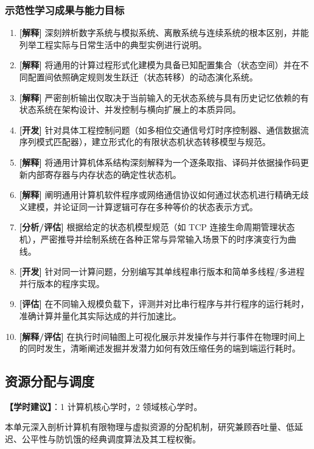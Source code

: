 \subsubsection{示范性学习成果与能力目标}
\begin{enumerate}
    \item \textbf{[解释]} 深刻辨析数字系统与模拟系统、离散系统与连续系统的根本区别，并能列举工程实际与日常生活中的典型实例进行说明。
    \item \textbf{[解释]} 将通用的计算过程形式化建模为具备已知配置集合（状态空间）并在不同配置间依照确定规则发生跃迁（状态转移）的动态演化系统。
    \item \textbf{[解释]} 严密剖析输出仅取决于当前输入的无状态系统与具有历史记忆依赖的有状态系统在架构设计、并发控制与横向扩展上的本质异同。
    \item \textbf{[开发]} 针对具体工程控制问题（如多相位交通信号灯时序控制器、通信数据流序列模式匹配器），建立形式化的有限状态机状态转移模型与规范。
    \item \textbf{[解释]} 将通用计算机体系结构深刻解释为一个逐条取指、译码并依据操作码更新内部寄存器与内存状态的确定性状态机。
    \item \textbf{[解释]} 阐明通用计算机软件程序或网络通信协议如何通过状态机进行精确无歧义建模，并论证同一计算逻辑可存在多种等价的状态表示方式。
    \item \textbf{[分析/评估]} 根据给定的状态机模型规范（如 TCP 连接生命周期管理状态机），严密推导并绘制系统在各种正常与异常输入场景下的时序演变行为曲线。
    \item \textbf{[开发]} 针对同一计算问题，分别编写其单线程串行版本和简单多线程/多进程并行版本的程序实现。
    \item \textbf{[评估]} 在不同输入规模负载下，评测并对比串行程序与并行程序的运行耗时，准确计算并量化其实际达成的并行加速比。
    \item \textbf{[解释/评估]} 在执行时间轴图上可视化展示并发操作与并行事件在物理时间上的同时发生，清晰阐述发掘并发潜力如何有效压缩任务的端到端运行耗时。
\end{enumerate}

\subsection{资源分配与调度}
\textbf{【学时建议】}：1 计算机核心学时，2 领域核心学时。

本单元深入剖析计算机有限物理与虚拟资源的分配机制，研究兼顾吞吐量、低延迟、公平性与防饥饿的经典调度算法及其工程权衡。

